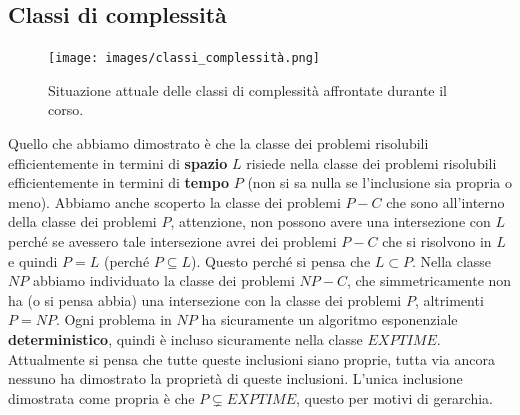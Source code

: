 \documentclass{article}
\begin{document}
\subsection{Classi di complessità}
\begin{figure}[H]
    \centering
    \texttt{[image: images/classi\_complessità.png]}
    \caption{Situazione attuale delle classi di complessità affrontate durante il corso.}
\end{figure}
Quello che abbiamo dimostrato è che la classe dei problemi risolubili efficientemente in termini
di \textbf{spazio} $L$ risiede nella classe dei problemi risolubili efficientemente in termini di \textbf{tempo} $P$
(non si sa nulla se l'inclusione sia propria o meno).
\newline\newline
Abbiamo anche scoperto la classe
dei problemi $P-C$ che sono all'interno della classe dei problemi $P$, attenzione, non possono
avere una intersezione con $L$ perché se avessero tale intersezione avrei dei problemi $P-C$
che si risolvono in $L$ e quindi $P=L$ (perché $P\subseteq L$). Questo perché si pensa che
$L\subset P$.
\newline\newline
Nella classe $NP$ abbiamo individuato la classe dei problemi $NP-C$, che simmetricamente
non ha (o si pensa abbia) una intersezione con la classe dei problemi $P$, altrimenti $P=NP$.
\newline\newline
Ogni problema in $NP$ ha sicuramente un algoritmo esponenziale \textbf{deterministico}, quindi è incluso
sicuramente nella classe $EXPTIME$. Attualmente si pensa che tutte queste inclusioni siano proprie,
tutta via ancora nessuno ha dimostrato la proprietà di queste inclusioni.
\newline\newline
L'unica inclusione dimostrata come propria è che $P\subsetneq EXPTIME$, questo per motivi di gerarchia.
\end{document}
